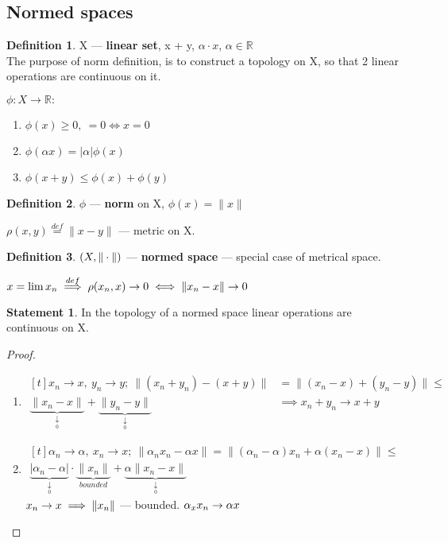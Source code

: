 \documentclass[12pt, fleqn]{article}
\theoremstyle{definition}
\newtheorem*{defn}{Definition}
\theoremstyle{break}
\theoremstyle{theorem}
\newtheorem{stm}{Statement}[section]
\newcommand{\defeq}{\overset{def}{=}}
\newcommand{\tendsto}[2]{\underbrace{#1}_{\underset{#2}{\downarrow}}}
\begin{document}
\subsection{Normed spaces}
\begin{defn}
  X --- \textbf{linear set}, x + y, $\alpha \cdot x$, $\alpha \in \mathbb{R}$
  \\The purpose of norm definition, is to construct a topology on X, so that 2 linear operations are continuous on it.
\end{defn}
$\phi: X \to \mathbb{R}\colon$
\begin{enumerate}
\item $\phi(x) \geq 0,\ = 0 \iff x = 0$
\item $\phi(\alpha x) = |\alpha| \phi(x)$
\item $\phi(x + y) \leq \phi(x) + \phi(y)$
\end{enumerate}
\begin{defn}
  $\phi$ --- \textbf{norm} on X, $\phi(x) = \|x\|$
\end{defn}
$\rho(x, y) \defeq \|x - y\|$ --- metric on X. 
\begin{defn}
  $\\(X, \|\cdot\|)$ --- \textbf{normed space} --- special case of metrical space.
\end{defn}
$\\x = \lim x_n \overset{def}{\implies} \rho(x_n, x) \to 0 \iff \|x_n - x\| \to 0$
\begin{stm}
  In the topology of a normed space linear operations are continuous on X.
\end{stm}
\begin{proof}
  \begin{enumerate}
  \item 
    $\begin{aligned}[t]
      x_n \to x,\ y_n \to y;\ \|(x_n + y_n) - (x + y)\| & = \|(x_n - x) + (y_n - y)\|  \leq \\ 
      \tendsto{\|x_n - x\|}{0} + \tendsto{\|y_n - y\|}{0} & \implies x_n + y_n \to x + y
    \end{aligned}$
  \item 
    $\begin{aligned}[t]
       \alpha_n \to \alpha,\ x_n \to x;\ \|\alpha_n x_n - \alpha x\| =
        \|(\alpha_n - \alpha)x_n + \alpha(x_n - x)\| \leq \\
        \tendsto{|\alpha_n - \alpha|}{0} \cdot \underbrace{\|x_n\|}_{bounded} + \tendsto{\alpha\|x_n - x\|}{0}
    \end{aligned}$
    $\\x_n \to x \implies \|x_n\|$ --- bounded.
    $\\\alpha_x x_n \to \alpha x\qedhere$
  \end{enumerate}
\end{proof}
\end{document}
